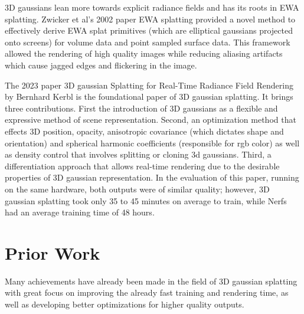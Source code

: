 \documentclass[10pt,twocolumn]{article}
\begin{document}
3D gaussians lean more towards explicit radiance fields and has its roots in EWA splatting. Zwicker et al's\cite{zwicker2002ewa} 2002 paper EWA splatting provided a novel method to effectively derive EWA splat primitives (which are elliptical gaussians projected onto screens) for volume data and point sampled surface data. This framework allowed the rendering of high quality images while reducing aliasing artifacts which cause jagged edges and flickering in the image\cite{zwicker2002ewa}.

The 2023 paper 3D gaussian Splatting for Real-Time Radiance Field Rendering by Bernhard Kerbl is the foundational paper of 3D gaussian splatting. It brings three contributions. First the introduction of 3D gaussians as a flexible and expressive method of scene representation. Second, an optimization method that effects 3D position, opacity, anisotropic covariance (which dictates shape and orientation) and spherical harmonic coefficients (responsible for rgb color) as well as density control that involves splitting or cloning 3d gaussians. Third, a differentiation approach that allows real-time rendering due to the desirable properties of 3D gaussian representation\cite{kerbl20233dgaussiansplattingrealtime}. In the evaluation of this paper, running on the same hardware, both outputs were of similar quality; however, 3D gaussian splatting took only 35 to 45 minutes on average to train, while Nerfs had an average training time of 48 hours\cite{kerbl20233dgaussiansplattingrealtime}.

\section{Prior Work}

Many achievements have already been made in the field of 3D gaussian splatting with great focus on improving the already fast training and rendering time, as well as developing better optimizations for higher quality outputs.
\end{document}
